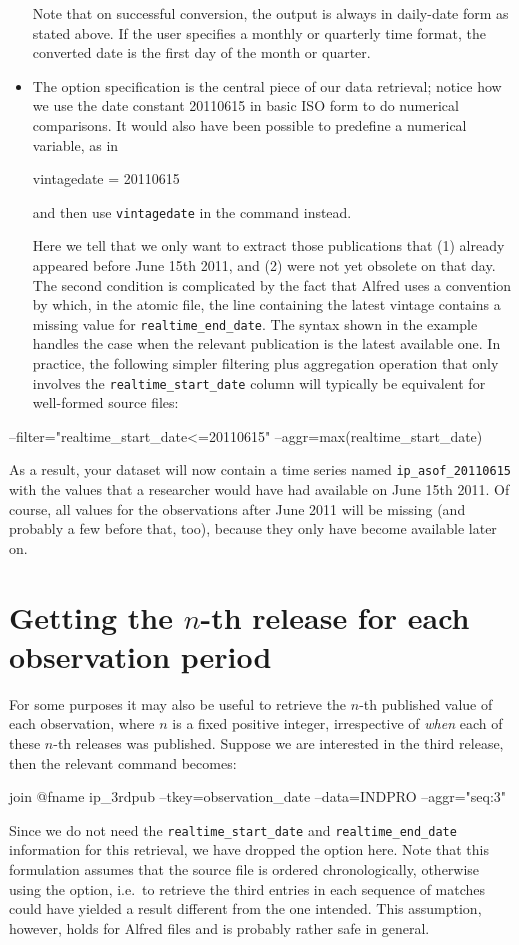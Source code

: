 \begin{itemize}
  Note that on successful conversion, the output is always in
  daily-date form as stated above. If the user specifies a monthly or
  quarterly time format, the converted date is the first day of the
  month or quarter.
\item The  option specification is the central piece of
  our data retrieval; notice how we use the date constant 20110615 in
  basic ISO form to do numerical comparisons. It would also have been
  possible to predefine a numerical variable, as in
 \begin{code}
   vintagedate = 20110615
 \end{code}
 and then use \texttt{vintagedate} in the  command instead.

  Here we tell  that we only want to extract those
  publications that (1) already appeared before June 15th 2011, and
  (2) were not yet obsolete on that day. The second condition is
  complicated by the fact that Alfred uses a convention by which, in
  the atomic file, the line containing the latest vintage contains a
  missing value for \texttt{realtime\_end\_date}. The syntax shown in
  the example handles the case when the relevant publication is the
  latest available one. In practice, the following simpler filtering
  plus aggregation operation that only involves the
  \verb|realtime_start_date| column will typically be equivalent for
  well-formed source files: 
\end{itemize}
\begin{code}
  --filter="realtime_start_date<=20110615" --aggr=max(realtime_start_date)
\end{code}
As a result, your dataset will now contain a time series named
\verb|ip_asof_20110615| with the values that a researcher would have
had available on June 15th 2011. Of course, all values for the
observations after June 2011 will be missing (and probably a few
before that, too), because they only have become available later on.

\section{Getting the $n$-th release for each observation period}

For some purposes it may also be useful to retrieve the $n$-th published
value of each observation, where $n$ is a fixed positive integer,
irrespective of \emph{when} each of these $n$-th releases was
published. Suppose we are interested in the third release, then the
relevant  command becomes:
\begin{code}
  join @fname ip_3rdpub --tkey=observation_date --data=INDPRO --aggr="seq:3"
\end{code}
Since we do not need the \verb|realtime_start_date| and
\verb|realtime_end_date| information for this retrieval, we have
dropped the  option here. Note that this formulation
assumes that the source file is ordered chronologically, otherwise
using the  option, i.e.\ to retrieve the third
entries in each sequence of matches could have yielded a result
different from the one intended. This assumption, however, holds for
Alfred files and is probably rather safe in general.

